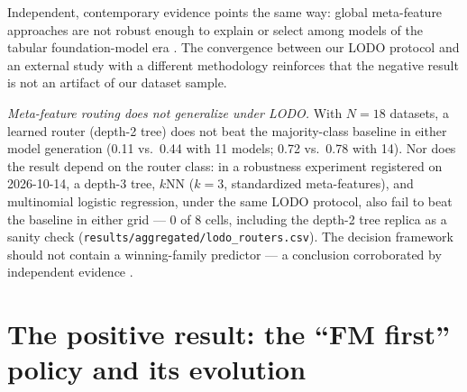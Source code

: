 Independent, contemporary evidence points the same way: global
meta-feature approaches are not robust enough to explain or select
among models of the tabular foundation-model era \citep{herre2026}.
The convergence between our LODO protocol and an external study with
a different methodology reinforces that the negative result is not
an artifact of our dataset sample.

\emph{Meta-feature routing does not generalize under LODO.} With
$N{=}18$ datasets, a learned router (depth-2 tree) does not beat the
majority-class baseline in either model generation (0.11 vs.\ 0.44
with 11 models; 0.72 vs.\ 0.78 with 14). Nor does the result depend
on the router class: in a robustness experiment registered on
2026-10-14, a depth-3 tree, $k$NN ($k{=}3$, standardized
meta-features), and multinomial logistic regression, under the same
LODO protocol, also fail to beat the baseline in either grid --- 0
of 8 cells, including the depth-2 tree replica as a sanity check
(\texttt{results/\allowbreak aggregated/\allowbreak lodo\_\allowbreak routers.\allowbreak csv}).
The decision framework should not contain a winning-family predictor
--- a conclusion corroborated by independent evidence
\citep{herre2026}.

\section{The positive result: the ``FM first'' policy and its evolution}
\label{sec:resultado-positivo}

